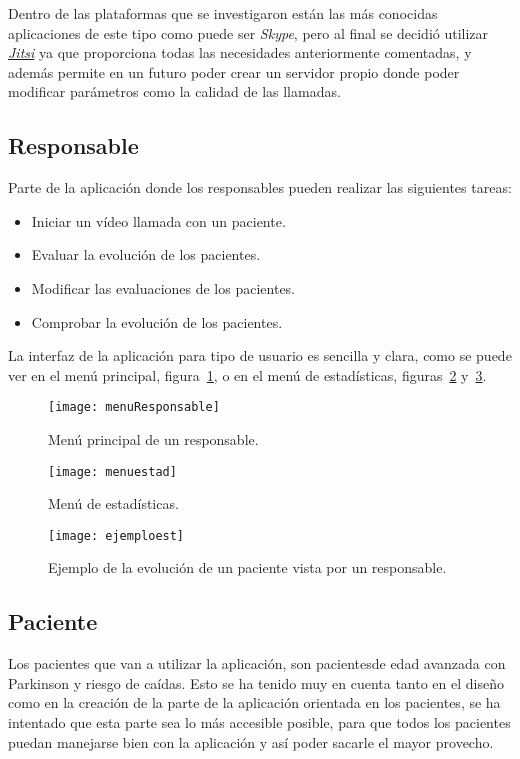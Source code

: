 Dentro de las plataformas que se investigaron están las más conocidas aplicaciones de este tipo como puede ser \textit{Skype}, pero al final se decidió utilizar \href{https://jitsi.org/}{\textit{Jitsi}} ya que proporciona todas las necesidades anteriormente comentadas, y además permite en un futuro poder crear un servidor propio donde poder modificar parámetros como la calidad de las llamadas.

\subsection{Responsable}
Parte de la aplicación donde los responsables pueden realizar las siguientes tareas:
\begin{itemize}
	\item Iniciar un vídeo llamada con un paciente.
	\item Evaluar la evolución de los pacientes.
	\item Modificar las evaluaciones de los pacientes.
	\item Comprobar la evolución de los pacientes.
\end{itemize}

La interfaz de la aplicación para tipo de usuario es sencilla y clara, como se puede ver en el menú principal, figura~\ref{fig:menuPaciente}, o en el menú de estadísticas, figuras~\ref{fig:menuest} y~\ref{fig:ejemploest}.

\begin{figure}[h]
	\centering
	\texttt{[image: menuResponsable]}
	\caption{Menú principal de un responsable.}
	\label{fig:menuPaciente}
\end{figure}

\begin{figure}[h]
	\centering
	\texttt{[image: menuestad]}
	\caption{Menú de estadísticas.}
	\label{fig:menuest}
\end{figure}

\begin{figure}[h]
	\centering
	\texttt{[image: ejemploest]}
	\caption{Ejemplo de la evolución de un paciente vista por un responsable.}
	\label{fig:ejemploest}
\end{figure}

\subsection{Paciente}
Los pacientes que van a utilizar la aplicación, son pacientesde edad avanzada con Parkinson y riesgo de caídas. Esto se ha tenido muy en cuenta tanto en el diseño como en la creación de la parte de la aplicación orientada en los pacientes, se ha intentado que esta parte sea lo más accesible posible, para que todos los pacientes puedan manejarse bien con la aplicación y así poder sacarle el mayor provecho.

